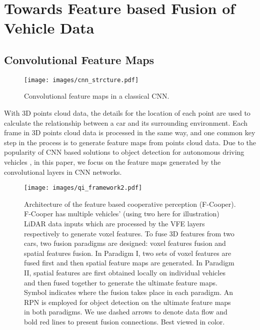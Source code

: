 \documentclass[sigconf]{acmart}
\begin{document}
\section{Towards Feature based Fusion of Vehicle Data}



\subsection{Convolutional Feature Maps}

\begin{figure}
    \centering
    \texttt{[image: images/cnn\_strcture.pdf]}
    \vspace{-7pt}
    \caption{Convolutional feature maps in a classical CNN.}
    \vspace{-22pt}
    \label{fig:cnn}
\end{figure}



With 3D points cloud data, the details for the location of each point are used to calculate the relationship between a car and its surrounding environment. Each frame in 3D points cloud data is processed in the same way, and one common key step in the process is to generate feature maps from points cloud data. Due to the popularity of CNN based solutions to object detection for autonomous driving vehicles \cite{rajaram2016refinenet,li2019stereo,chen2016monocular}, in this paper, we focus on the feature maps generated by the convolutional layers in CNN networks.

\begin{figure*}[!t]
    \centering
    \texttt{[image: images/qi\_framework2.pdf]}
    \caption{
    Architecture of the feature based cooperative perception (F-Cooper). F-Cooper has multiple vehicles' (using two here for illustration) LiDAR data inputs which are processed by the VFE layers respectively to generate voxel features. To fuse 3D features from two cars, two fusion paradigms are designed: voxel features fusion and spatial features fusion. In Paradigm I, two sets of voxel features are fused first and then spatial feature maps are generated. In Paradigm II, spatial features are first obtained locally on individual vehicles and then fused together to generate the ultimate feature maps. Symbol  indicates where the fusion takes place in each paradigm. An RPN is employed for object detection on the ultimate feature maps in both paradigms. We use dashed arrows to denote data flow and bold red lines to present fusion connections. Best viewed in color.}
    \label{fig:architecture}
\end{figure*}
\end{document}
